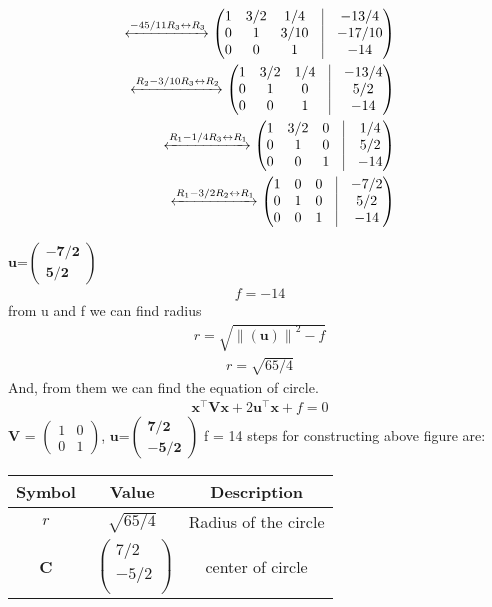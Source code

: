 \documentclass[journal,10pt,twocolumn]{article}
\providecommand{\norm}[1]{\left\lVert#1\right\rVert}
\let\vec\mathbf
\newcommand{\myvec}[1]{\ensuremath{\begin{pmatrix}#1\end{pmatrix}}}
\begin{document}
\begin{align}
	     \xleftrightarrow[]{-45/11R_3 \leftrightarrow R_3}
	     \myvec{1&3/2&1/4&\vrule&-13/4\\0&1&3/10&\vrule&-17/10\\0&0&1&\vrule&-14}\\
	     \xleftrightarrow[]{R_2-3/10R_3 \leftrightarrow R_2}
	     \myvec{1&3/2&1/4&\vrule&-13/4\\0&1&0&\vrule&5/2\\0&0&1&\vrule&-14}\\	
	      \xleftrightarrow[]{R_1-1/4R_3 \leftrightarrow R_1}
	      	     \myvec{1&3/2&0&\vrule&1/4\\0&1&0&\vrule&5/2\\0&0&1&\vrule&-14}\\
	       \xleftrightarrow[]{R_1-3/2R_2 \leftrightarrow R_1}	
\myvec{1&0&0&\vrule&-7/2\\0&1&0&\vrule&5/2\\0&0&1&\vrule&-14}\\
\end{align}
\begin{center}
\end{center}
 $\vec{u}$=$\vec{\begin{pmatrix}-7/2 \\5/2 \end{pmatrix}}$ 
\begin{align}
f=-14
\end{align}
from u and f we can find radius
\begin{align}
 r = \sqrt{\norm{\vec{(u)}}^2-f} 
\end{align}
\begin{align}
r = \sqrt{65/4}
\end{align}
And, from them we can find the equation of circle.\\
 \begin{align}
\vec{x}^{\top}\vec{V}\vec{x}+2\vec{u}^{\top}\vec{x}+f=0
\end{align}	
$\vec{V}$ = $\begin{pmatrix}
 1 & 0\\
 0 & 1
 \end{pmatrix}$, 
  $\vec{u}$=$\vec{\begin{pmatrix}7/2 \\-5/2 \end{pmatrix}}$
  f = 14
steps for constructing above figure are:  
\begin{center}
\begin{tabular}{|c|c|c|}
	\hline
	\textbf{Symbol}&\textbf{Value}&\textbf{Description}\\
	\hline
	$r$&$\sqrt{65/4}$&Radius of the circle\\
	\hline
	\textbf{C}&$\
	\begin{pmatrix}
		7/2 \\
		-5/2 \\
	\end{pmatrix}$
	&center of circle\\
	\hline
\end{tabular}
\end{center}
\vspace{1mm}
\end{document}
